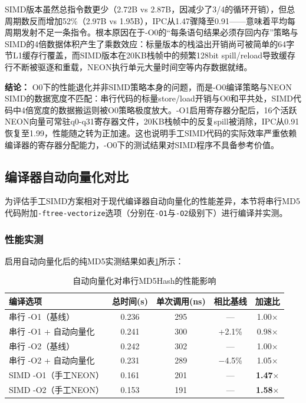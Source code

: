\documentclass[UTF8,a4paper,10pt]{ctexart}
\begin{document}
SIMD版本虽然总指令数更少（2.72B vs 2.87B，因减少了3/4的循环开销），但总周期数反而增加52\%（2.97B vs 1.95B），IPC从1.47骤降至0.91——意味着平均每周期发射不足一条指令。根本原因在于-O0的“每条语句结果必须存回内存”策略与SIMD的4倍数据体积产生了乘数效应：标量版本的栈溢出开销尚可被简单的64字节L1缓存行覆盖，而SIMD版本在20KB栈帧中的频繁128bit spill/reload导致缓存行不断被驱逐和重载，NEON执行单元大量时间空等内存数据就绪。

\noindent\textbf{结论：} O0下的性能退化并非SIMD策略本身的问题，而是-O0编译策略与NEON SIMD的数据宽度不匹配：串行代码的标量store/load开销与O0和平共处，SIMD代码中4倍宽度的数据搬运则被O0策略极度放大。-O1启用寄存器分配后，16个活跃NEON向量可常驻q0-q31寄存器文件，20KB栈帧中的反复spill被消除，IPC从0.91恢复至1.99，性能随之转为正加速。这也说明手工SIMD代码的实际效率严重依赖编译器的寄存器分配能力，-O0下的测试结果对SIMD程序不具备参考价值。


\subsection{编译器自动向量化对比}
\label{sec:autovec}

为评估手工SIMD方案相对于现代编译器自动向量化的性能差异，本节将串行MD5代码附加\lstinline{-ftree-vectorize}选项（分别在\lstinline{-O1}与\lstinline{-O2}级别下）进行编译并实测。

\subsubsection{性能实测}

启用自动向量化后的纯MD5实测结果如表\ref{tab:autovec}所示：

\begin{table}[ht]
\centering
\caption{自动向量化对串行MD5Hash的性能影响}
\label{tab:autovec}
\begin{tabular}{lcccc}
\hline
\textbf{编译选项} & \textbf{总时间(s)} & \textbf{单次调用(ns)} & \textbf{相比基线} & \textbf{加速比} \\
\hline
串行 -O1（基线）    & 0.236 & 295 & ---  & 1.00$\times$ \\
串行 -O1 + 自动向量化 & 0.241 & 300 & +2.1\% & 0.98$\times$ \\
串行 -O2（基线）    & 0.242 & 302 & ---  & 1.00$\times$ \\
串行 -O2 + 自动向量化 & 0.231 & 289 & $-$4.5\% & 1.05$\times$ \\
\hline
SIMD -O1（手工NEON） & 0.161 & 201 & --- & \textbf{1.47}$\times$ \\
SIMD -O2（手工NEON） & 0.153 & 191 & --- & \textbf{1.58}$\times$ \\
\hline
\end{tabular}
\end{table}
\end{document}
